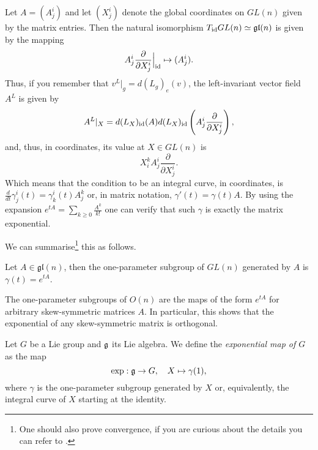 Let $A = (A^i_j)$ and let $(X^i_j)$ denote the global coordinates on $GL(n)$ given by the matrix entries.
Then the natural isomorphism $T_{\operatorname{id}}GL(n) \simeq \mathfrak{gl}(n)$ is given by the mapping
\begin{equation}
  A^i_j \frac{\partial }{\partial X^i_j}\Big|_{\operatorname{id}} \mapsto (A^i_j).
\end{equation}
Thus, if you remember that $v^L|_g = d(L_g)_e(v)$, the left-invariant vector field $A^L$ is given by
\begin{equation}
  A^L|_X = d(L_X)_{\operatorname{id}}(A) d(L_X)_{\operatorname{id}}\left(A^i_j \frac{\partial }{\partial X^i_j}\right),
\end{equation}
and, thus, in coordinates, its value at $X\in GL(n)$ is
\begin{equation}
  X^k_i A^i_j \frac{\partial }{\partial X^i_j}.
\end{equation}
Which means that the condition to be an integral curve, in coordinates, is $\frac{d}{dt}\gamma^i_j(t) = \gamma^i_k(t) A^k_j$ or, in matrix notation, $\gamma'(t) = \gamma(t) A$.
By using the expansion $e^{tA} = \sum_{k\geq 0} \frac{A^k}{k!}$ one can verify that such $\gamma$ is exactly the matrix exponential.

We can summarise\footnote{One should also prove convergence, if you are curious about the details you can refer to \cite[Proposition 20.2]{book:lee}.} this as follows.

\begin{proposition}\label{prop:expmat}
  Let $A\in\mathfrak{gl}(n)$, then the one-parameter subgroup of $GL(n)$ generated by $A$ is $\gamma(t) = e^{tA}$.
\end{proposition}

\begin{exercise}
  The one-parameter subgroups of $O(n)$ are the maps of the form $e^{tA}$ for arbitrary skew-symmetric matrices $A$.
  In particular, this shows that the exponential of any skew-symmetric matrix is orthogonal.
\end{exercise}

\begin{definition}
  Let $G$ be a Lie group and $\mathfrak{g}$ its Lie algebra.
  We define the \emph{exponential map of $G$} as the map
  \begin{equation}
    \exp: \mathfrak{g} \to G , \quad X \mapsto \gamma(1),
  \end{equation}
  where $\gamma$ is the one-parameter subgroup generated by $X$ or, equivalently, the integral curve of $X$ starting at the identity.
\end{definition}

